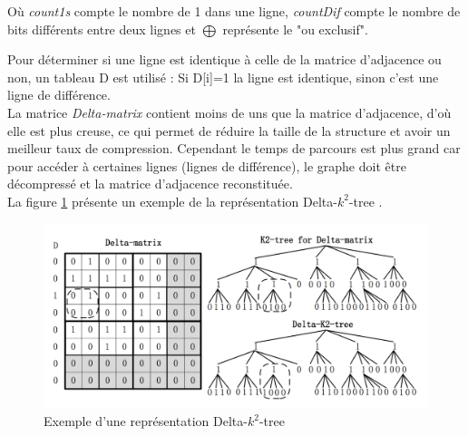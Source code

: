 Où \textit{count1s} compte le nombre de 1 dans une ligne, \textit{countDif} compte le nombre de bits différents entre deux lignes et $\bigoplus$ représente le "ou exclusif".

Pour déterminer si une ligne est identique à celle de la matrice d'adjacence ou non, un tableau D est utilisé : Si D[i]=1 la ligne est identique, sinon c'est une ligne de différence.\\
La matrice \textit{Delta-matrix} contient moins de uns que la matrice d'adjacence, d'où elle est plus creuse, ce qui permet de réduire la taille de la structure et avoir un meilleur taux de compression. Cependant le temps de parcours est plus grand car pour accéder à certaines lignes (lignes de différence), le graphe doit être décompressé et la matrice d'adjacence reconstituée.\\
La figure \ref{k2-trees-delta} présente un exemple de la représentation Delta-$k^2$-tree \citep{zhang2014delta}.


\begin{figure}[H]
\begin{center}
\includegraphics[height=150 pt, width=380 pt]{./ressources/image/k2-trees-delta.png} 
\end{center}
\caption{Exemple d'une représentation Delta-$k^2$-tree}
\label{k2-trees-delta}
\end{figure}

